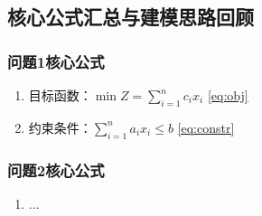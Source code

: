
\subsection{核心公式汇总与建模思路回顾}

\subsubsection*{问题1核心公式}
\begin{enumerate}
  \item 目标函数：$\displaystyle \min Z = \sum_{i=1}^{n} c_i x_i$ \hfill \cref{eq:obj}
  \item 约束条件：$\displaystyle \sum_{i=1}^{n} a_i x_i \leq b$ \hfill \cref{eq:constr}
\end{enumerate}

\subsubsection*{问题2核心公式}
\begin{enumerate}
  \item ...
\end{enumerate}

